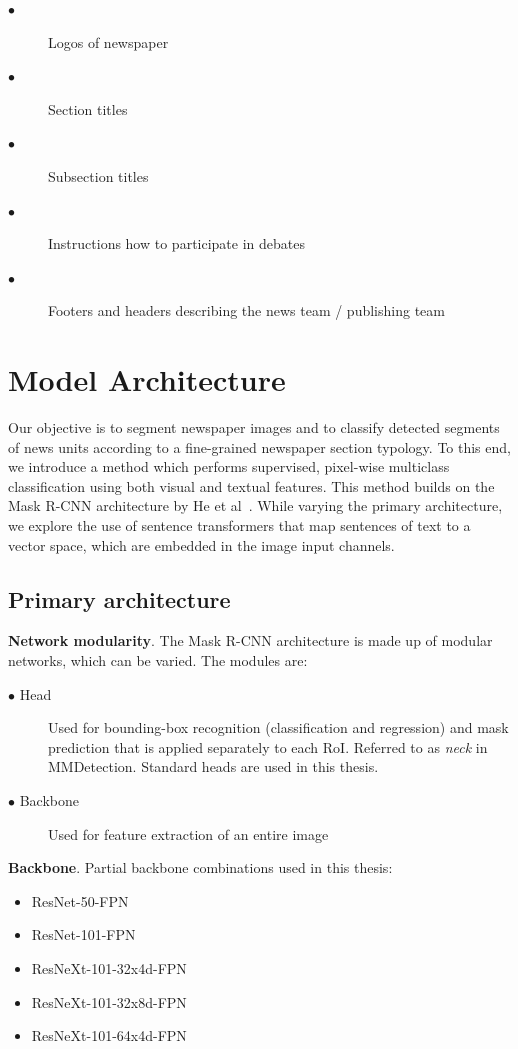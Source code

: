 \documentclass[oneside, english, bibtex]{kththesis}
\begin{document}
\begin{description}
\item[$\bullet$] Logos of newspaper
\item[$\bullet$] Section titles
\item[$\bullet$] Subsection titles
\item[$\bullet$] Instructions how to participate in debates
\item[$\bullet$] Footers and headers describing the news team / publishing team
\end{description}


\clearpage

\section{Model Architecture}
\label{sec:modelarch}

Our objective is to segment newspaper images and to classify detected segments of news units according to a fine-grained newspaper section typology. To this end, we introduce a method which performs supervised, pixel-wise multiclass classification using both visual and textual features. This method builds on the Mask R-CNN architecture by He et al~\cite{DBLP:journals/corr/HeGDG17}. While varying the primary architecture, we explore the use of sentence transformers that map sentences of text to a vector space, which are embedded in the image input channels.

\subsection{Primary architecture}

\textbf{Network modularity}. The Mask R-CNN architecture is made up of modular networks, which can be varied. The modules are:

\begin{description}
\item[$\bullet$ Head] Used for bounding-box recognition (classification and regression) and mask prediction that is applied separately to each RoI. Referred to as \textit{neck} in MMDetection. Standard heads are used in this thesis.
\item[$\bullet$ Backbone] Used for feature extraction of an entire image
\end{description}

\textbf{Backbone}. Partial backbone combinations used in this thesis:

\begin{itemize}
\item ResNet-50-FPN
\item ResNet-101-FPN
\item ResNeXt-101-32x4d-FPN 
\item ResNeXt-101-32x8d-FPN
\item ResNeXt-101-64x4d-FPN
\end{itemize}
\end{document}

